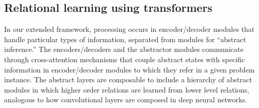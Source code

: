 %
%
%
%
%


\subsection{Relational learning using transformers}

In our extended framework, processing occurs in encoder/decoder modules that handle particular types of information,
separated from modules for ``abstract inference.'' The encoders/decoders and the abstractor modules communicate
through cross-attention mechanisms that couple abstract states with specific information in encoder/decoder modules to which they refer in a given problem instance.  The abstract layers are composable to include a hierarchy of abstract modules in which higher order relations are learned from lower level relations, analogous to how convolutional layers are composed in deep neural networks.

